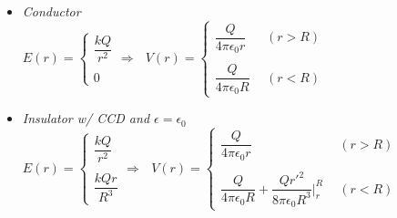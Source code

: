\documentclass[12pt]{article}
\begin{document}
\begin{landscape}
\begin{minipage}[t]{.61\textwidth}
	\begin{itemize}
		\item \emph{Conductor}\\[15pt]
		\( E(r) = \begin{cases}
			\dfrac{k Q}{r^2}\\ \\
			0 
		\end{cases} 
		\Rightarrow \ \ \ V(r) = \begin{cases}
			\dfrac{ Q }{4 \pi \epsilon_0 r} & \ \ (r > R)\\ \\
			\dfrac{ Q }{4 \pi \epsilon_0 R} & \ \ (r < R)
		\end{cases} \)
	\end{itemize}
	\begin{itemize}
		\item \emph{Insulator w/ CCD and \(\epsilon = \epsilon_0\)}\\[15pt]
		\( E(r) = \begin{cases}
			\dfrac{k Q}{r^2}\\ \\
			\dfrac{k Q r}{R^3}
		\end{cases} 
		\Rightarrow \ \ \ V(r) = \begin{cases}
			\dfrac{ Q }{4 \pi \epsilon_0 r} & \ \ (r > R)\\ \\
			\dfrac{ Q }{4 \pi \epsilon_0 R} + \dfrac{Q r'^2}{8 \pi \epsilon_0 R^3} \bigg|_{r}^{R} & \ \ (r < R)
		\end{cases} \)
	\end{itemize}
\end{minipage}

\end{landscape}

%
%
%
\newpage
\end{document}
